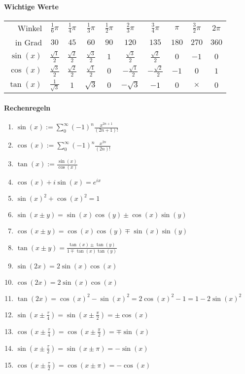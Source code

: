 \documentclass[a4paper, 9pt, DIV=24]{scrartcl}
\begin{document}
\paragraph{Wichtige Werte}
\begin{center}
\begin{tabular}[m]{r|ccccccccc}
Winkel & $\frac{1}{6}\pi$ & $\frac{1}{4}\pi$ & $\frac{1}{3}\pi$ & $\frac{1}{2}\pi$ & $\frac{2}{3}\pi$ & $\frac{3}{4}\pi$ & $\pi$ & $\frac{3}{2}\pi$ & $2\pi$ \\[.1em]
in Grad & $30$ & $45$ & $60$ & $90$ & $120$ & $135$ & $180$ & $270$ & $360$ \\\hline
$\sin(x)$ & $\frac{\sqrt{1}}{2}$ & $\frac{\sqrt{2}}{2}$ & $\frac{\sqrt{3}}{2}$ & $1$ & $\frac{\sqrt{3}}{2}$ & $\frac{\sqrt{2}}{2}$ & $0$ & $-1$ & $0$ \\[.1em]
$\cos(x)$ & $\frac{\sqrt{3}}{2}$ & $\frac{\sqrt{2}}{2}$ & $\frac{\sqrt{1}}{2}$ & $0$ & $-\frac{\sqrt{1}}{2}$ & $-\frac{\sqrt{2}}{2}$ & $-1$ & $0$ & $1$ \\[.1em]
$\tan(x)$ & $\frac{1}{\sqrt{3}}$ & $1$ & $\sqrt{3}$ & $0$ & $-\sqrt{3}$ & $-1$ & $0$ & $\times$ & $0$ \\
\end{tabular}
\end{center}

\paragraph{Rechenregeln}
\begin{enumerate}[label={(}\arabic*{)}]
 \item $\sin(x) := \sum_0^\infty (-1)^n\frac{x^{2n+1}}{(2n+1)!}$
 \item $\cos(x) := \sum_0^\infty (-1)^n\frac{x^{2n}}{(2n)!}$
 \item $\tan(x) := \frac{\sin(x)}{\cos(x)}$
 \item $\cos(x) + i\sin(x) = e^{ix}$
 \item $\sin(x)^2 + \cos(x)^2 = 1$
 \item $\sin(x \pm y) = \sin(x)\cos(y) \pm \cos(x)\sin(y)$
 \item $\cos(x \pm y) = \cos(x)\cos(y) \mp \sin(x)\sin(y)$
 \item $\tan(x \pm y) = \frac{\tan(x)\pm\tan(y)}{1\mp\tan(x)\tan(y)}$
 \item $\sin(2x) = 2\sin(x)\cos(x)$
 \item $\cos(2x) = 2\sin(x)\cos(x)$
 \item $\tan(2x) = \cos(x)^2 - \sin(x)^2 = 2\cos(x)^2 - 1 = 1 - 2\sin(x)^2$
 \item $\sin(x \pm \frac{\tau}{4}) = \sin(x\pm\frac{\pi}{2}) = \pm\cos(x)$
 \item $\cos(x \pm \frac{\tau}{4}) = \cos(x\pm\frac{\pi}{2}) = \mp\sin(x)$
 \item $\sin(x \pm \frac{\tau}{2}) = \sin(x\pm\pi) = -\sin(x)$
 \item $\cos(x \pm \frac{\tau}{2}) = \cos(x\pm\pi) = -\cos(x)$
\end{enumerate}
\end{document}
